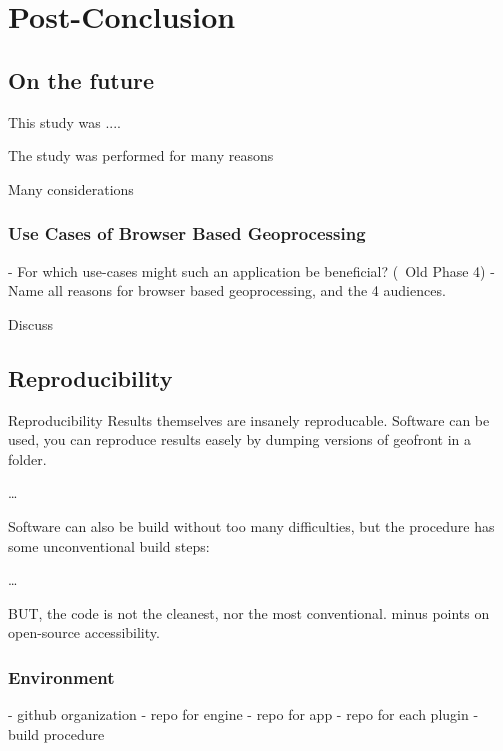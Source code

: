 \chapter{Post-Conclusion}%

\section{On the future}

This study was ....

The study was performed for many reasons

Many considerations



\subsection{Use Cases of Browser Based Geoprocessing}



- For which use-cases might such an application be beneficial? (~Old Phase 4)
- Name all reasons for browser based geoprocessing, and the 4 audiences.

Discuss 

\section{Reproducibility}

Reproducibility
Results themselves are insanely reproducable.
Software can be used, you can reproduce results easely by dumping versions of geofront in 
a folder.

\dots

Software can also be build without too many difficulties, but the procedure has some unconventional build steps: 

\dots

BUT, the code is not the cleanest, nor the most conventional. minus points on open-source accessibility.



\subsection{Environment}%
- github organization 
- repo for engine 
- repo for app 
- repo for each plugin
- build procedure

